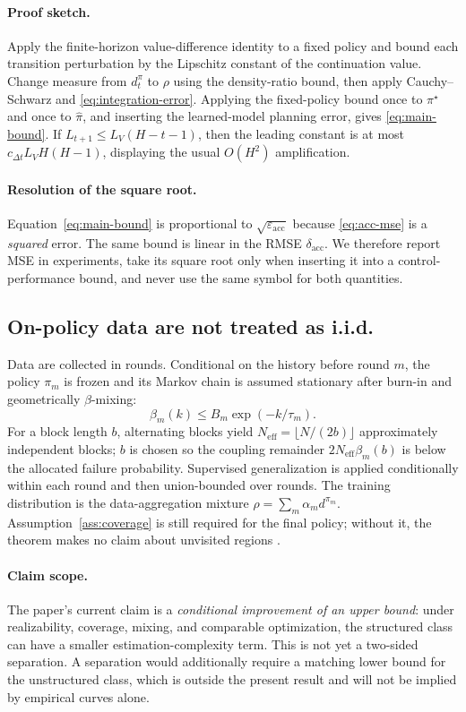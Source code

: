 \documentclass[11pt]{article}
\newcommand{\epsacc}{\varepsilon_{\mathrm{acc}}}
\newcommand{\dacc}{\delta_{\mathrm{acc}}}
\begin{document}
\paragraph{Proof sketch.}
Apply the finite-horizon value-difference identity to a fixed policy and bound
each transition perturbation by the Lipschitz constant of the continuation
value.  Change measure from $d_t^\pi$ to $\rho$ using the density-ratio bound,
then apply Cauchy--Schwarz and \eqref{eq:integration-error}.  Applying the
fixed-policy bound once to $\pi^\star$ and once to $\hat\pi$, and inserting the
learned-model planning error, gives \eqref{eq:main-bound}. If
$L_{t+1}\le L_V(H-t-1)$, then the leading constant is at most
$c_{\Delta t}L_VH(H-1)$, displaying the usual $O(H^2)$ amplification.

\paragraph{Resolution of the square root.}
Equation~\eqref{eq:main-bound} is proportional to
$\sqrt{\epsacc}$ because \eqref{eq:acc-mse} is a \emph{squared} error.  The same
bound is linear in the RMSE $\dacc$.  We therefore report MSE in experiments,
take its square root only when inserting it into a control-performance bound,
and never use the same symbol for both quantities.

\subsection{On-policy data are not treated as i.i.d.}
Data are collected in rounds.  Conditional on the history before round $m$,
the policy $\pi_m$ is frozen and its Markov chain is assumed stationary after
burn-in and geometrically $\beta$-mixing:
\[
  \beta_m(k)\le B_m\exp(-k/\tau_m).
\]
For a block length $b$, alternating blocks yield
$N_{\mathrm{eff}}=\lfloor N/(2b)\rfloor$ approximately independent blocks; $b$
is chosen so the coupling remainder
$2N_{\mathrm{eff}}\beta_m(b)$ is below the allocated failure probability.
Supervised generalization is applied conditionally within each round and then
union-bounded over rounds.  The training distribution is the data-aggregation
mixture $\rho=\sum_m\alpha_m d^{\pi_m}$.  Assumption~\ref{ass:coverage} is still
required for the final policy; without it, the theorem makes no claim about
unvisited regions \cite{mohri2010mixing}.

\paragraph{Claim scope.}
The paper's current claim is a \emph{conditional improvement of an upper
bound}: under realizability, coverage, mixing, and comparable optimization,
the structured class can have a smaller estimation-complexity term.  This is
not yet a two-sided separation.  A separation would additionally require a
matching lower bound for the unstructured class, which is outside the present
result and will not be implied by empirical curves alone.
\end{document}
